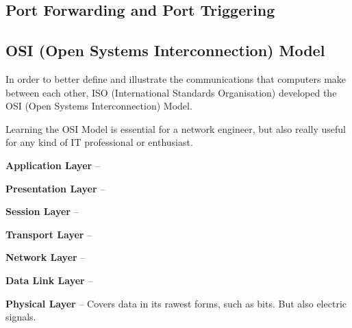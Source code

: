 \documentclass{article}
\begin{document}
\subsection{Port Forwarding and Port Triggering}

\subsection{OSI (Open Systems Interconnection) Model}

In order to better define and illustrate the communications that computers make between each other, ISO (International Standards Organisation) developed the OSI (Open Systems Interconnection) Model.

Learning the OSI Model is essential for a network engineer, but also really useful for any kind of IT professional or enthusiast.

\begin{etaremune}
\item \textbf{Application Layer} --
\item \textbf{Presentation Layer} --
\item \textbf{Session Layer} --
\item \textbf{Transport Layer} --
\item \textbf{Network Layer} --
\item \textbf{Data Link Layer} --
\item \textbf{Physical Layer} -- Covers data in its rawest forms, such as bits. But also electric signals.
\end{etaremune}


\\
\end{document}

